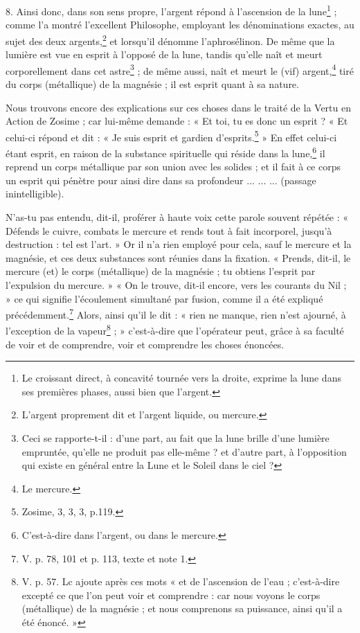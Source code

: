 \documentclass[a4paper, 11pt, oneside, polutonikogreek, french]{article}
\begin{document}
8. Ainsi donc, dans son sens propre, l'argent répond à l'ascension de la lune\footnote{Le croissant direct, à concavité tournée vers la droite, exprime la lune dans ses premières phases, aussi bien que l'argent.} ; comme l'a montré l'excellent Philosophe, employant les dénominations exactes, au sujet des deux argents,\footnote{L'argent proprement dit et l'argent liquide, ou mercure.} et lorsqu'il dénomme l'aphrosélinon. De même que la lumière est vue en esprit à l'opposé de la lune, tandis qu'elle naît et meurt corporellement dans cet astre\footnote{Ceci se rapporte-t-il : d'une part, au fait que la lune brille d'une lumière empruntée, qu'elle ne produit pas elle-même ? et d'autre part, à l'opposition qui existe en général entre la Lune et le Soleil dans le ciel ?} ; de même aussi, naît et meurt le (vif) argent,\footnote{Le mercure.} tiré du corps (métallique) de la magnésie ; il est esprit quant à sa nature.

Nous trouvons encore des explications sur ces choses dans le traité de la Vertu en Action de Zosime ; car lui-même demande : « Et toi, tu es donc un esprit ? « Et celui-ci répond et dit : « Je suis esprit et gardien d'esprits.\footnote{Zosime, 3, 3, 3, p.119.} » En effet celui-ci étant esprit, en raison de la substance spirituelle qui réside dans la lune,\footnote{C'est-à-dire dans l'argent, ou dans le mercure.} il reprend un corps métallique par son union avec les solides ; et il fait à ce corps un esprit qui pénètre pour ainsi dire dans sa profondeur ... ... ... (passage inintelligible).

N'as-tu pas entendu, dit-il, proférer à haute voix cette parole souvent répétée : « Défends le cuivre, combats le mercure et rends tout à fait incorporel, jusqu'à destruction : tel est l'art. » Or il n'a rien employé pour cela, sauf le mercure et la magnésie, et ces deux substances sont réunies dans la fixation. « Prends, dit-il, le mercure (et) le corps (métallique) de la magnésie ; tu obtiens l'esprit par l'expulsion du mercure. » « On le trouve, dit-il encore, vers les courants du Nil ; » ce qui signifie l'écoulement simultané par fusion, comme il a été expliqué précédemment.\footnote{V. p. 78, 101 et p. 113, texte et note 1.} Alors, ainsi qu'il le dit : « rien ne manque, rien n'est ajourné, à l'exception de la vapeur\footnote{V. p. 57. Lc ajoute après ces mots « et de l'ascension de l'eau ; c'est-à-dire excepté ce que l'on peut voir et comprendre : car nous voyons le corps (métallique) de la magnésie ; et nous comprenons sa puissance, ainsi qu'il a été énoncé. »} ; » c'est-à-dire que l'opérateur peut, grâce à sa faculté de voir et de comprendre, voir et comprendre les choses énoncées.
\end{document}
